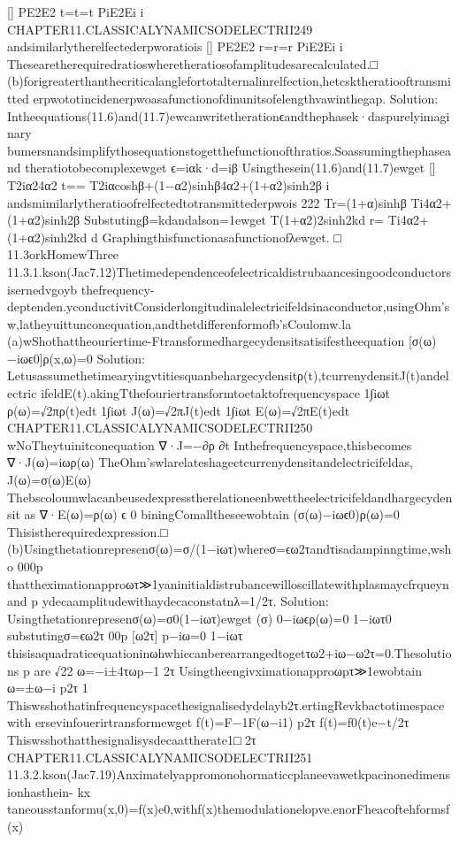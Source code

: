 {{{{{{{{{{{{{{{{[]
PE2E2
t=t=t
PiE2Ei
i
CHAPTER11.CLASSICALYNAMICSODELECTRII249
andsimilarlytherelfectederpworatiois
[]
PE2E2
r=r=r
PiE2Ei
i
Thesearetherequiredratioswheretheratiosofamplitudesarecalculated.□
(b)forigreaterthanthecriticalanglefortotalternalinrelfection,hetcsktheratiooftransmitted
erpwototincidenerpwoasafunctionofdinunitsofelengthvawinthegap.
Solution:
Intheequations(11.6)and(11.7)ewcanwritetherationϵandthephasek·daspurelyimaginary
bumersnandsimplifythosequationstogetthefunctionofthratios.Soassumingthephaseand
theratiotobecomplexewget
ϵ=iαk·d=iβ
Usingthesein(11.6)and(11.7)ewget
[]
T2iα24α2
t==
T2iαcoshβ+(1−α2)sinhβ4α2+(1+α2)sinh2β
i
andsmimilarlytheratioofrelfectedtotransmittederpwois
222
Tr=(1+α)sinhβ
Ti4α2+(1+α2)sinh2β
Substutingβ=kdandalson=1ewget
T(1+α2)2sinh2kd
r=
Ti4α2+(1+α2)sinh2kd
d
Graphingthisfunctionasafunctionofλewget.
□
11.3orkHomewThree
11.3.1.kson(Jac7.12)Thetimedependenceofelectricaldistrubaancesingoodconductorsisernedvgoyb
thefrequency-deptenden.yconductivitConsiderlongitudinalelectricifeldsinaconductor,usingOhm’s
w,latheyuittunconequation,andthetdifferenformofb’sCoulomw.la
(a)wShothattheouriertime-Ftransformedhargecydensitsatisifestheequation
[σ(ω)−iωϵ0]ρ(x,ω)=0
Solution:
Letusassumethetimearyingvtitiesquanbehargecydensitρ(t),tcurrenydensitJ(t)andelectric
ifeldE(t).akingTthefouriertransformtoetaktofrequencyspace
1∫iωt
ρ(ω)=√2πρ(t)edt
1∫iωt
J(ω)=√2πJ(t)edt
1∫iωt
E(ω)=√2πE(t)edt
CHAPTER11.CLASSICALYNAMICSODELECTRII250
wNoTheytuinitconequation
∇·J=−∂ρ
∂t
Inthefrequencyspace,thisbecomes
∇·J(ω)=iωρ(ω)
TheOhm’swlarelateshagectcurrenydensitandelectricifeldas,
J(ω)=σ(ω)E(ω)
Thebscoloumwlacanbeusedexpresstherelationeenbwettheelectricifeldandhargecydensit
as
∇·E(ω)=ρ(ω)
ϵ
0
biningComalltheseewobtain
(σ(ω)−iωϵ0)ρ(ω)=0
Thisistherequiredexpression.□
(b)Usingthetationrepresenσ(ω)=σ/(1−iωτ)whereσ=ϵω2τandτisadampinngtime,wsho
000p
thattheximationapproωτ≫1yaninitialdistrubancewilloscillatewithplasmaycfrqueynand
p
ydecaamplitudewithaydecaconstatnλ=1/2τ.
Solution:
Usingthetationrepresenσ(ω)=σ0(1−iωτ)ewget
(σ)
0−iωϵρ(ω)=0
1−iωτ0
substutingσ=ϵω2τ
00p
[ω2τ]
p−iω=0
1−iωτ
thisisaquadraticequationinωhwhiccanberearrangedtogetτω2+iω−ω2τ=0.Thesolutions
p
are
√22
ω=−i±4τωp−1
2τ
Usingtheengivximationapproωpτ≫1ewobtain
ω=±ω−i
p2τ
1
Thiswsshothatinfrequencyspacethesignalisedydelayb2τ.ertingRevkbactotimespacewith
ersevinfouerirtransformewget
f(t)=F−1F(ω−i1)
p2τ
f(t)=f0(t)e−t/2τ
Thiswsshothatthesignalisysdecaattherate1□
2τ
CHAPTER11.CLASSICALYNAMICSODELECTRII251
11.3.2.kson(Jac7.19)Anximatelyappromonohormaticcplaneevawetkpacinonedimensionhasthein-
kx
taneousstanformu(x,0)=f(x)e0,withf(x)themodulationelopve.enorFheacoftehformsf(x)
}}}}}}}}}}}}}}}}
